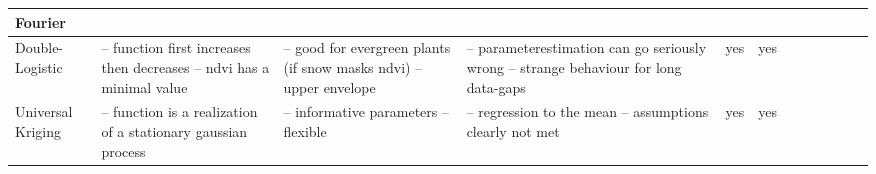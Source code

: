 \begin{table}[!ht]
\begin{tabular}{p{1.6cm}p{3.3cm}p{3.3cm}p{3.3cm}p{0.4cm}p{0.4cm}p{3cm}p{3cm}p{3cm}p{3cm}p{3cm}p{3cm}|}
    Fourier                                                                               &
    ~                                                                                     &
    ~                                                                                     &
    ~                                                                                     &
    ~                                                                                     &
    ~                                                                                           \\ \hline%

    Double-Logistic                                                                       &
    -- function first increases then decreases -- ndvi has a minimal value                &
    -- good for evergreen plants (if snow masks ndvi) --upper envelope                    &
    -- parameterestimation can go seriously wrong -- strange behaviour for long data-gaps &
    yes                                                                                   &
    yes                                                                                         \\ \hline%

    Universal Kriging                                                                     &
    -- function is a realization of a stationary gaussian process                         &
    -- informative parameters -- flexible                                                 &
    -- regression to the mean -- assumptions clearly not met                              &
    yes                                                                                   &
    yes                                                                                         \\ \hline%


    \hline
  \end{tabular}
\end{table}
